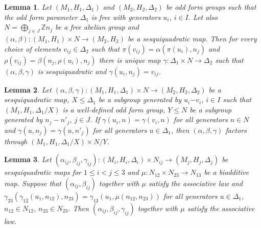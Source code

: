 \documentclass{article}
\newtheorem{lemma}{Lemma}
\theoremstyle{definition}
\newcommand{\dotminus}{\mathbin{\dot{-}}}
\begin{document}
\begin{lemma} \label{ofg-sq-free}
    Let \(
        (M_1, H_1, \Delta_1)
    \) and \(
        (M_2, H_2, \Delta_2)
    \) be odd form groups such that the odd form parameter \(\Delta_1\) is free with generators \(u_i\), \(i \in I\). Let also \(
        N = \bigoplus_{j \in J} \mathbb Z n_j
    \) be a free abelian group and \(
        (\alpha, \beta)
        \colon (M_1, H_1) \times N
        \to (M_2, H_2)
    \) be a sesquiquadratic map. Then for every choice of elements \(v_{ij} \in \Delta_2\) such that \(
        \pi(v_{ij}) = \alpha(\pi(u_i), n_j)
    \) and \(
        \rho(v_{ij}) = \beta(n_j, \rho(u_i), n_j)
    \) there is unique map \(
        \gamma \colon \Delta_1 \times N \to \Delta_2
    \) such that \(
        (\alpha, \beta, \gamma)
    \) is sesquiquadratic and \(
        \gamma(u_i, n_j) = v_{ij}
    \).
\end{lemma}

\begin{lemma} \label{ofg-sq-fact}
    Let \(
        (\alpha, \beta, \gamma)
        \colon (M_1, H_1, \Delta_1) \times N
        \to (M_2, H_2, \Delta_2)
    \) be a sesquiquadratic map, \(X \leq \Delta_1\) be a subgroup generated by \(
        u_i \dotminus v_i
    \), \(i \in I\) such that \(
        (M_1, H_1, \Delta_1 / X)
    \) is a well-defined odd form group, \(Y \leq N\) be a subgroup generated by \(
        n_j - n'_j
    \), \(j \in J\). If \(
        \gamma(u_i, n) = \gamma(v_i, n)
    \) for all generators \(n \in N\) and \(
        \gamma(u, n_j) = \gamma(u, n'_j)
    \) for all generators \(u \in \Delta_1\), then \(
        (\alpha, \beta, \gamma)
    \) factors through \(
        (M_1, H_1, \Delta_1 / X) \times N / Y
    \).
\end{lemma}

\begin{lemma} \label{ofg-sq-ass}
    Let \(
        (\alpha_{ij}, \beta_{ij}, \gamma_{ij})
        \colon (M_i, H_i, \Delta_i) \times N_{ij}
        \to (M_j, H_j, \Delta_j)
    \) be sesquiquadratic maps for \(1 \leq i < j \leq 3\) and \(
        \mu \colon N_{12} \times N_{23} \to N_{13}
    \) be a biadditive map. Suppose that \(
        (\alpha_{ij}, \beta_{ij})
    \) together with \(\mu\) satisfy the associative law and \(
        \gamma_{23}(\gamma_{12}(u_1, n_{12}), n_{23})
        =
        \gamma_{13}(u_1, \mu(n_{12}, n_{23}))
    \) for all generators \(u \in \Delta_1\), \(n_{12} \in N_{12}\), \(n_{23} \in N_{23}\). Then \(
        (\alpha_{ij}, \beta_{ij}, \gamma_{ij})
    \) together with \(\mu\) satisfy the associative law.
\end{lemma}
\end{document}
